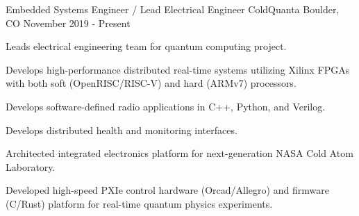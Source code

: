 

\begin{cventries}


  \cventry
    {Embedded Systems Engineer / Lead Electrical Engineer} %
    {ColdQuanta} %
    {Boulder, CO} %
    {November 2019 - Present} %
    {
      \begin{cvitems} %
		\item {
			Leads electrical engineering team for quantum computing project.
		}
        \item {
			Develops high-performance distributed real-time systems utilizing \textrm{Xilinx} FPGAs with both soft (\textrm{OpenRISC}/\textrm{RISC-V}) and hard (\textrm{ARMv7}) processors.
        }
		\item {
			Develops software-defined radio applications in \textrm{C++}, \textrm{Python}, and \textrm{Verilog}.
		}
        \item {
			Develops distributed health and monitoring interfaces.
        }
		\item {
			Architected integrated electronics platform for next-generation NASA Cold Atom Laboratory.
		}
		\item {
				Developed high-speed PXIe control hardware (\textrm{Orcad/Allegro}) and firmware (\textrm{C}/\textrm{Rust}) platform for real-time quantum physics experiments.
		}
      \end{cvitems}
    }



\end{cventries}
